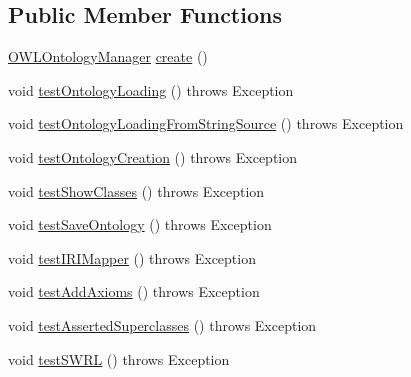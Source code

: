 \subsection*{Public Member Functions}
\begin{DoxyCompactItemize}
\item 
\hyperlink{interfaceorg_1_1semanticweb_1_1owlapi_1_1model_1_1_o_w_l_ontology_manager}{O\-W\-L\-Ontology\-Manager} \hyperlink{classuk_1_1ac_1_1manchester_1_1owl_1_1owlapi_1_1tutorialowled2011_1_1_tutorial_snippets_a4fb54cf860c4acef3db4270b3bd6e5ec}{create} ()
\item 
void \hyperlink{classuk_1_1ac_1_1manchester_1_1owl_1_1owlapi_1_1tutorialowled2011_1_1_tutorial_snippets_a8cd37fdd2f5b6fd2ad24254722a42e01}{test\-Ontology\-Loading} ()  throws Exception 
\item 
void \hyperlink{classuk_1_1ac_1_1manchester_1_1owl_1_1owlapi_1_1tutorialowled2011_1_1_tutorial_snippets_a6ff87a1ef112ac64baa52eb541b7b735}{test\-Ontology\-Loading\-From\-String\-Source} ()  throws Exception 
\item 
void \hyperlink{classuk_1_1ac_1_1manchester_1_1owl_1_1owlapi_1_1tutorialowled2011_1_1_tutorial_snippets_af93319c31549faa018954df010523518}{test\-Ontology\-Creation} ()  throws Exception 
\item 
void \hyperlink{classuk_1_1ac_1_1manchester_1_1owl_1_1owlapi_1_1tutorialowled2011_1_1_tutorial_snippets_a04ce26096428f9b7a2943e9355b2744a}{test\-Show\-Classes} ()  throws Exception 
\item 
void \hyperlink{classuk_1_1ac_1_1manchester_1_1owl_1_1owlapi_1_1tutorialowled2011_1_1_tutorial_snippets_a20358d7cc3f7f3945969940a86fde111}{test\-Save\-Ontology} ()  throws Exception 
\item 
void \hyperlink{classuk_1_1ac_1_1manchester_1_1owl_1_1owlapi_1_1tutorialowled2011_1_1_tutorial_snippets_a568ab2958b2cc58884eb066e792f74bf}{test\-I\-R\-I\-Mapper} ()  throws Exception 
\item 
void \hyperlink{classuk_1_1ac_1_1manchester_1_1owl_1_1owlapi_1_1tutorialowled2011_1_1_tutorial_snippets_a238a1c95c75386205bf8b25d3959ed36}{test\-Add\-Axioms} ()  throws Exception 
\item 
void \hyperlink{classuk_1_1ac_1_1manchester_1_1owl_1_1owlapi_1_1tutorialowled2011_1_1_tutorial_snippets_a7ae3cee99772c2a6ac2cc4c37d9124e9}{test\-Asserted\-Superclasses} ()  throws Exception 
\item 
void \hyperlink{classuk_1_1ac_1_1manchester_1_1owl_1_1owlapi_1_1tutorialowled2011_1_1_tutorial_snippets_aaec0eb265b43e0b9499045cea513def6}{test\-S\-W\-R\-L} ()  throws Exception 

\end{DoxyCompactItemize}
